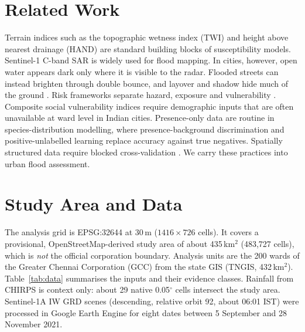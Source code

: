 \documentclass[conference]{IEEEtran}
\begin{document}
\section{Related Work}
Terrain indices such as the topographic wetness index (TWI) \cite{beven1979twi} and height above nearest drainage (HAND) \cite{nobre2011hand} are standard building blocks of susceptibility models. Sentinel-1 C-band SAR \cite{torres2012s1} is widely used for flood mapping. In cities, however, open water appears dark only where it is visible to the radar. Flooded streets can instead brighten through double bounce, and layover and shadow hide much of the ground \cite{mason2018urban,chini2019coherence,zhao2024review}. Risk frameworks separate hazard, exposure and vulnerability \cite{ipcc2012srex}. Composite social vulnerability indices \cite{cutter2003sovi} require demographic inputs that are often unavailable at ward level in Indian cities. Presence-only data are routine in species-distribution modelling, where presence-background discrimination \cite{phillips2006maxent} and positive-unlabelled learning \cite{elkan2008pu} replace accuracy against true negatives. Spatially structured data require blocked cross-validation \cite{roberts2017cv,valavi2019blockcv}. We carry these practices into urban flood assessment.

\section{Study Area and Data}
The analysis grid is EPSG:32644 at 30\,m ($1416\times726$ cells). It covers a provisional, OpenStreetMap-derived study area of about 435\,km$^2$ (483{,}727 cells), which is \emph{not} the official corporation boundary. Analysis units are the 200 wards of the Greater Chennai Corporation (GCC) from the state GIS (TNGIS, 432\,km$^2$). Table~\ref{tab:data} summarises the inputs and their evidence classes. Rainfall from CHIRPS \cite{funk2015chirps} is context only: about 29 native 0.05$^\circ$ cells intersect the study area. Sentinel-1A IW GRD scenes (descending, relative orbit 92, about 06:01 IST) were processed in Google Earth Engine \cite{gorelick2017gee} for eight dates between 5 September and 28 November 2021.
\end{document}
